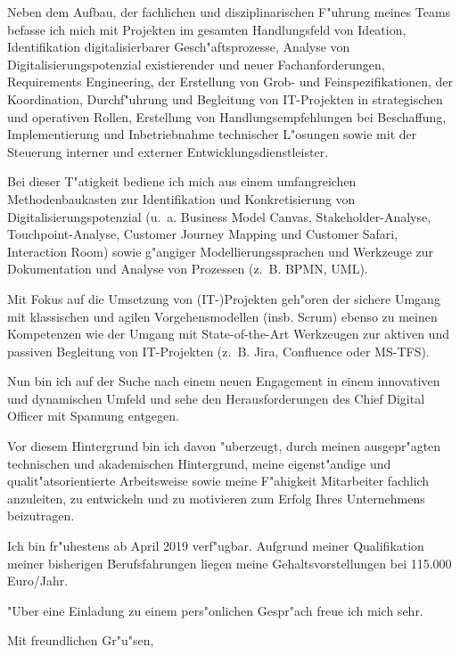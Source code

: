 \documentclass[10pt,a4paper]{dinbrief}
\begin{document}
\begin{letter}
Neben dem Aufbau, der fachlichen und disziplinarischen F"uhrung meines Teams befasse ich mich  mit Projekten im gesamten Handlungsfeld von Ideation, Identifikation digitalisierbarer Gesch"afts\-prozesse, Analyse von Digitalisierungspotenzial existierender und neuer Fachanforderungen, Requirements Engineering, der Erstellung von Grob- und Feinspezifikationen, der Koordination, Durchf"uhrung und Begleitung von IT-Projekten in strategischen und operativen Rollen, Erstellung von Handlungsempfehlungen bei Beschaffung, Implementierung und Inbetriebnahme technischer L"osungen sowie mit der Steuerung interner und externer Entwicklungsdienstleister. 

Bei dieser T"atigkeit bediene ich mich aus einem umfangreichen Methodenbaukasten zur Identifikation und Konkretisierung von Digitalisierungspotenzial (u.~a. Business Model Canvas, Stakeholder-Analyse, Touchpoint-Analyse, Customer Journey Mapping und Customer Safari, Interaction Room) sowie g"angiger Modellierungssprachen und Werkzeuge zur Dokumentation und Analyse von Prozessen (z.~B. BPMN, UML).

Mit Fokus auf die Umsetzung von (IT-)Projekten geh"oren der sichere Umgang mit klassischen und agilen Vorgehensmodellen (insb. Scrum) ebenso zu meinen Kompetenzen wie der Umgang mit State-of-the-Art Werkzeugen zur aktiven und passiven Begleitung von IT-Projekten (z.~B. Jira, Confluence oder MS-TFS).

Nun bin ich auf der Suche nach einem neuen Engagement in einem innovativen und dynamischen Umfeld und sehe den Herausforderungen des Chief Digital Officer mit Spannung entgegen.

Vor diesem Hintergrund bin ich davon "uberzeugt, durch meinen ausgepr"agten technischen und akademischen Hintergrund, meine eigenst"andige und qualit"atsorientierte Arbeitsweise sowie meine F"ahigkeit Mitarbeiter fachlich anzuleiten, zu entwickeln und zu motivieren zum Erfolg Ihres Unternehmens beizutragen.

Ich bin fr"uhestens ab April 2019 verf"ugbar. Aufgrund meiner Qualifikation meiner bisherigen Berufsfahrungen liegen meine Gehaltsvorstellungen bei 115.000 Euro/Jahr. 

"Uber eine Einladung zu einem pers"onlichen Gespr"ach freue ich mich sehr.

\closing{Mit freundlichen Gr"u"sen,}
\end{letter}
\end{document}
